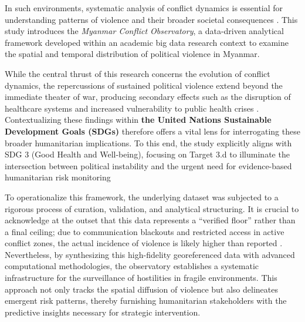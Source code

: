 \documentclass[conference]{IEEEtran}
\begin{document}
In such environments, systematic analysis of conflict dynamics is essential for understanding patterns of violence and their broader societal consequences \cite{tkacova2023conflict,herbert2017conflict}. This study introduces the \textit{Myanmar Conflict Observatory}, a data-driven analytical framework developed within an academic big data research context to examine the spatial and temporal distribution of political violence in Myanmar.

While the central thrust of this research concerns the evolution of conflict dynamics, the repercussions of sustained political violence extend beyond the immediate theater of war, producing secondary effects such as the disruption of healthcare systems and increased vulnerability to public health crises \cite{ekzayez2021impact}. Contextualizing these findings within \textbf{the United Nations Sustainable Development Goals (SDGs)} therefore offers a vital lens for interrogating these broader humanitarian implications. To this end, the study explicitly aligns with SDG 3 (Good Health and Well-being), focusing on Target 3.d to illuminate the intersection between political instability and the urgent need for evidence-based humanitarian risk monitoring

To operationalize this framework, the underlying dataset was subjected to a rigorous process of curation, validation, and analytical structuring. It is crucial to acknowledge at the outset that this data represents a ``verified floor'' rather than a final ceiling; due to communication blackouts and restricted access in active conflict zones, the actual incidence of violence is likely higher than reported \cite{croicu2022reporting,vesco2024underreported}. Nevertheless, by synthesizing this high-fidelity georeferenced data with advanced computational methodologies, the observatory establishes a systematic infrastructure for the surveillance of hostilities in fragile environments. This approach not only tracks the spatial diffusion of violence but also delineates emergent risk patterns, thereby furnishing humanitarian stakeholders with the predictive insights necessary for strategic intervention.
\end{document}
